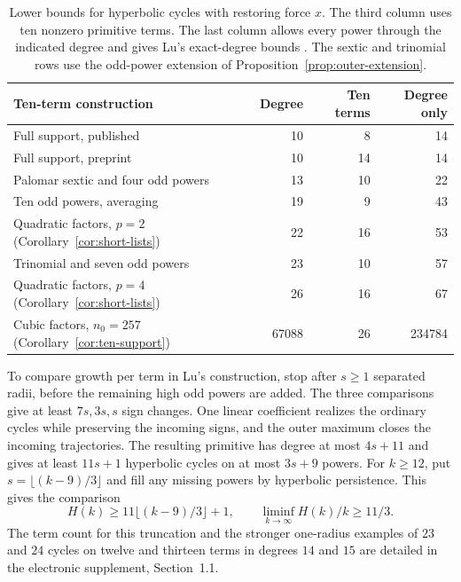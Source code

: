 \begin{table}[!htbp]
\centering\small
\caption{Lower bounds for hyperbolic cycles with restoring force $x$.
The third column uses ten nonzero primitive terms. The last column
allows every power through the indicated degree and gives Lu's
exact-degree bounds \cite[Theorem~1.1 and supplement, Proposition~S1.2]{LuDegree}.
The sextic and trinomial rows use the odd-power extension of
Proposition~\ref{prop:outer-extension}.}
\label{tab:ten-comparison}
\begin{tabular}{@{}lrrr@{}}
\toprule
Ten-term construction & Degree & Ten terms & Degree only\\
\midrule
Full support, published \cite[Theorem~1]{DMH} & 10 & 8 & 14\\
Full support, preprint \cite[supplement, Proposition~S1.2]{LuDegree} & 10 & 14 & 14\\
Palomar sextic and four odd powers \cite{Palomar} & 13 & 10 & 22\\
Ten odd powers, averaging \cite{LMP,BCG} & 19 & 9 & 43\\
Quadratic factors, $p=2$ (Corollary~\ref{cor:short-lists}) & 22 & 16 & 53\\
Trinomial and seven odd powers \cite{CJLZ} & 23 & 10 & 57\\
Quadratic factors, $p=4$ (Corollary~\ref{cor:short-lists}) & 26 & 16 & 67\\
Cubic factors, $n_0=257$ (Corollary~\ref{cor:ten-support}) & 67088 & 26 & 234784\\
\bottomrule
\end{tabular}
\end{table}

To compare growth per term in Lu's construction, stop after $s\ge1$ separated radii, before the remaining high
odd powers are added. The three comparisons give at least $7s,3s,s$
sign changes. One linear coefficient realizes the ordinary cycles
while preserving the incoming signs, and the outer maximum closes
the incoming trajectories. The resulting primitive has degree at most
$4s+11$ and gives at least $11s+1$ hyperbolic cycles on at most $3s+9$
powers. For $k\ge12$, put $s=\lfloor(k-9)/3\rfloor$ and fill any
missing powers by hyperbolic persistence. This gives the comparison
\[
 H(k)\ge11\lfloor(k-9)/3\rfloor+1,\qquad \liminf_{k\to\infty} H(k)/k\ge11/3 .
\]
The term count for this truncation and the stronger one-radius examples
of $23$ and $24$ cycles on twelve and thirteen terms in degrees $14$
and $15$ are detailed in the electronic supplement, Section~1.1.

